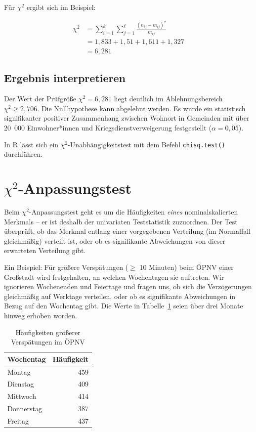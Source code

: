 \documentclass[
  11pt,
  ngerman,
  a4paper,
]{report}
\newenvironment{rtip}{
  \medskip
  \begin{tcolorbox}[colframe=purple,colback=light_gray,title=Softwarehinweis]
}{
  \end{tcolorbox}
  \medskip
}
\begin{document}
Für \(\chi^2\) ergibt sich im Beispiel:

\[
\begin{aligned}
\chi^2 &= \sum_{i=1}^{k}\sum_{j=1}^{\ell}\frac{(n_{ij}-m_{ij})^{2}}{m_{ij}}\\[4pt]
&=1{,}833+1{,}51+1{,}611+1{,}327\\
&=6{,}281
\end{aligned}
\]

\hypertarget{ergebnis-interpretieren-2}{%
\subsection{Ergebnis interpretieren}\label{ergebnis-interpretieren-2}}

Der Wert der Prüfgröße \(\chi^2=6{,}281\) liegt deutlich im Ablehnungsbereich \(\chi^2\geq 2{,}706\). Die Nullhypothese kann abgelehnt werden. Es wurde ein statistisch signifikanter positiver Zusammenhang zwischen Wohnort in Gemeinden mit über 20~000 Einwohner*innen und Kriegsdienstverweigerung festgestellt (\(\alpha=0{,}05\)).

\begin{rtip}
In R lässt sich ein $\chi^2$-Unabhängigkeitstest mit dem Befehl \verb|chisq.test()| durchführen.
\end{rtip}

\hypertarget{chi2-anpassungstest}{%
\section{\texorpdfstring{\(\chi^2\)-Anpassungstest}{\textbackslash chi\^{}2-Anpassungstest}}\label{chi2-anpassungstest}}

Beim \(\chi^2\)-Anpassungstest geht es um die Häufigkeiten \emph{eines} nominalskalierten Merkmals -- er ist deshalb der univariaten Teststatistik zuzuordnen. Der Test überprüft, ob das Merkmal entlang einer vorgegebenen Verteilung (im Normalfall gleichmäßig) verteilt ist, oder ob es signifikante Abweichungen von dieser erwarteten Verteilung gibt.

Ein Beispiel: Für größere Verspätungen (\(\geq\) 10 Minuten) beim ÖPNV einer Großstadt wird festgehalten, an welchen Wochentagen sie auftreten. Wir ignorieren Wochenenden und Feiertage und fragen uns, ob sich die Verzögerungen gleichmäßig auf Werktage verteilen, oder ob es signifikante Abweichungen in Bezug auf den Wochentag gibt. Die Werte in Tabelle~\ref{tab:late} seien über drei Monate hinweg erhoben worden.

\begin{table}

\caption{\label{tab:late}Häufigkeiten größerer Verspätungen im ÖPNV}
\centering
\begin{tabular}[t]{lr}
\toprule
\textbf{Wochentag} & \textbf{Häufigkeit}\\
\midrule
Montag & 459\\
Dienstag & 409\\
Mittwoch & 414\\
Donnerstag & 387\\
Freitag & 437\\
\bottomrule
\end{tabular}
\end{table}
\end{document}
